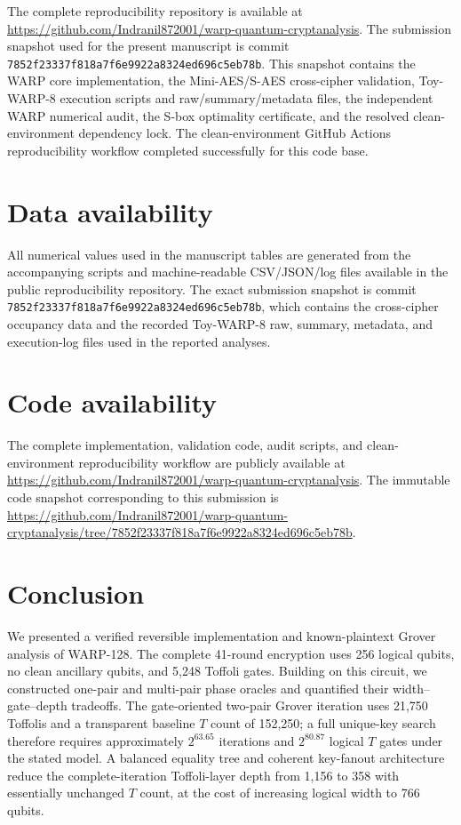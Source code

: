\documentclass[10pt,a4paper]{article}
\begin{document}
The complete reproducibility repository is available at \url{https://github.com/Indranil872001/warp-quantum-cryptanalysis}.  The submission snapshot used for the present manuscript is commit \texttt{7852f23337f818a7f6e9922a8324ed696c5eb78b}.  This snapshot contains the WARP core implementation, the Mini-AES/S-AES cross-cipher validation, Toy-WARP-8 execution scripts and raw/summary/metadata files, the independent WARP numerical audit, the S-box optimality certificate, and the resolved clean-environment dependency lock.  The clean-environment GitHub Actions reproducibility workflow completed successfully for this code base.


\section*{Data availability}
All numerical values used in the manuscript tables are generated from the accompanying scripts and machine-readable CSV/JSON/log files available in the public reproducibility repository.  The exact submission snapshot is commit \texttt{7852f23337f818a7f6e9922a8324ed696c5eb78b}, which contains the cross-cipher occupancy data and the recorded Toy-WARP-8 raw, summary, metadata, and execution-log files used in the reported analyses.

\section*{Code availability}
The complete implementation, validation code, audit scripts, and clean-environment reproducibility workflow are publicly available at
\url{https://github.com/Indranil872001/warp-quantum-cryptanalysis}.  The immutable code snapshot corresponding to this submission is
\url{https://github.com/Indranil872001/warp-quantum-cryptanalysis/tree/7852f23337f818a7f6e9922a8324ed696c5eb78b}.

\section{Conclusion}

We presented a verified reversible implementation and known-plaintext Grover analysis of WARP-128.  The complete 41-round encryption uses 256 logical qubits, no clean ancillary qubits, and 5,248 Toffoli gates.  Building on this circuit, we constructed one-pair and multi-pair phase oracles and quantified their width--gate--depth tradeoffs.  The gate-oriented two-pair Grover iteration uses 21,750 Toffolis and a transparent baseline $T$ count of 152,250; a full unique-key search therefore requires approximately $2^{63.65}$ iterations and $2^{80.87}$ logical $T$ gates under the stated model.  A balanced equality tree and coherent key-fanout architecture reduce the complete-iteration Toffoli-layer depth from 1,156 to 358 with essentially unchanged $T$ count, at the cost of increasing logical width to 766 qubits.
\end{document}
